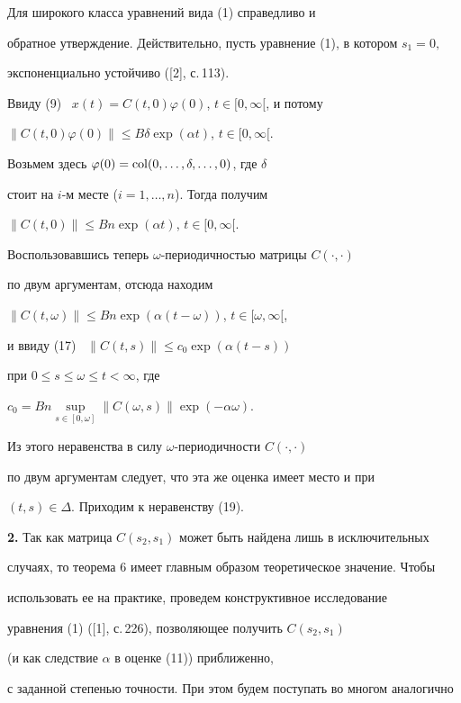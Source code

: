 \begin{notenonum}


Для широкого класса уравнений вида (1) справедливо и


обратное утверждение. Действительно, пусть уравнение (1), в котором $s_1=0,$


экспоненциально устойчиво ([2], с.\,113).


Ввиду (9) \ $x(t)=C(t,0)\varphi(0)$, $t\in [0,\infty[$, и потому


$\|C(t,0)\varphi(0)\|\le B\delta\exp(\alpha t)$, $t\in [0,\infty[$.


Возьмем здесь $\varphi(0)=\operatorname{col}(0,\dotsc,\delta,\dotsc,0)$, где $\delta$


стоит на $i$-м месте ($i=1,\dotsc,n$). Тогда получим


$\|C(t,0)\|\le B n\exp(\alpha t)$, $t\in [0,\infty[$.


Воспользовавшись теперь $\omega$-периодичностью матрицы $C(\cdot,\cdot)$


по двум аргументам, отсюда находим


$\|C(t,\omega)\|\le B n\exp(\alpha (t-\omega))$, $t\in [\omega,\infty[$,


и ввиду (17) \ $\|C(t,s)\|\le c_0 \exp(\alpha (t-s))$


при $0\le s\le \omega\le t<\infty$, где


$c_0=B n\sup\limits_{s\in [0,\omega]}\|C(\omega,s)\|\exp(-\alpha\omega)$.


Из этого неравенства в силу $\omega$-периодичности $C(\cdot,\cdot)$


по двум аргументам следует, что эта же оценка имеет место и при


$(t,s)\in\Delta$. Приходим к неравенству (19).


\end{notenonum}





{\bf 2.} Так как матрица $C(s_2,s_1)$ может быть найдена лишь в исключительных


случаях, то теорема 6 имеет главным образом теоретическое значение. Чтобы


использовать ее на практике, проведем конструктивное исследование 


уравнения (1) ([1], с.\,226), позволяющее получить $C(s_2,s_1)$


(и как следствие $\alpha$ в оценке (11)) приближенно,


с заданной степенью точности. При этом будем поступать во многом аналогично


